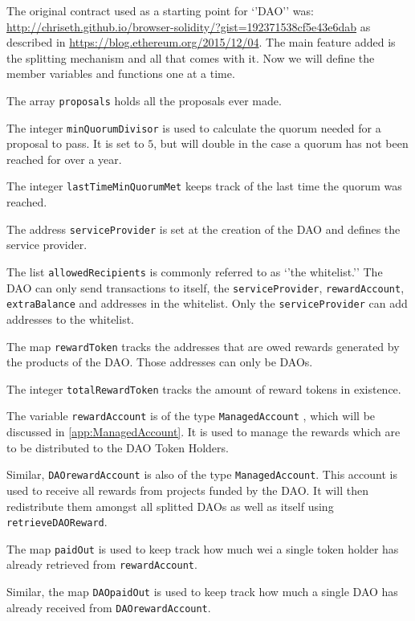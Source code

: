 \documentclass[9pt,oneside]{amsart}
\begin{document}
\begin{multicols}{2}
The original contract used as a starting point for ‘’DAO’’ was: \url{http://chriseth.github.io/browser-solidity/?gist=192371538cf5e43e6dab} as described in 
\url{https://blog.ethereum.org/2015/12/04}. The main feature added is the splitting mechanism and all that comes with it.
Now we will define the member variables and functions one at a time. 

The array \verb|proposals| holds all the proposals ever made. 

The integer \verb|minQuorumDivisor| is used to calculate the quorum needed for a proposal to pass. It is set to $5$, but will double in the case a quorum has not been reached for over a year.

The integer \verb|lastTimeMinQuorumMet| keeps track of the last time the quorum was reached.

The address \verb|serviceProvider| is set at the creation of the DAO and defines the service provider. 

The list \verb|allowedRecipients| is commonly referred to as ‘’the whitelist.’’ The DAO can only send transactions to itself, the \verb|serviceProvider|, \verb|rewardAccount|, \verb|extraBalance| and addresses in the whitelist. Only the \verb|serviceProvider| can add addresses to the whitelist. 

The map \verb|rewardToken| tracks the addresses that are owed rewards generated by the products of the DAO. Those addresses can only be DAOs.

The integer \verb|totalRewardToken| tracks the amount of reward tokens in existence.

The variable \verb|rewardAccount| is of the type \verb|ManagedAccount| , which will be discussed in \ref{app:ManagedAccount}. It is used to manage the rewards which are to be distributed to the DAO Token Holders.

Similar, \verb|DAOrewardAccount| is also of the type \verb|ManagedAccount|. This account is used to receive all rewards from projects funded by the DAO. It will then redistribute them amongst all splitted DAOs as well as itself using \verb|retrieveDAOReward|.

The map \verb|paidOut| is used to keep track how much wei a single token holder has already retrieved from \verb|rewardAccount|. 

Similar, the map \verb|DAOpaidOut| is used to keep track how much a single DAO has already received from \verb|DAOrewardAccount|.


\end{multicols}
\end{document}
